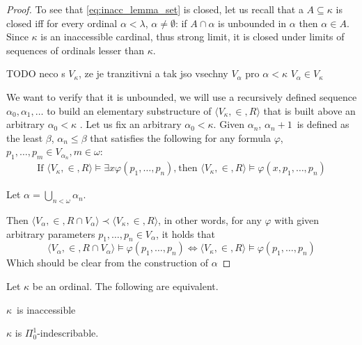 \begin{proof}
To see that \ref{eq:inacc_lemma_set} is closed, let us recall that a $A \subseteq \kappa$ is closed iff for every ordinal $\alpha < \lambda$, $\alpha \neq \emptyset$: if $A \cap \alpha$ is unbounded in $\alpha$ then $\alpha \in A$. Since $\kappa$ is an inaccessible cardinal, thus strong limit, it is closed under limits of sequences of ordinals lesser than $\kappa$.  

TODO neco s $V_\kappa$, ze je tranzitivni a tak jso vsechny $V_\alpha$ pro $\alpha<\kappa$ $V_\alpha \in V_\kappa$

We want to verify that it is unbounded, we will use a recursively defined sequence $\alpha_0, \alpha_1, \ldots$
to build an elementary substructure of $\langle V_\kappa, \in, R \rangle$ that is built above an arbitrary $\alpha_0 <\kappa$ .
Let us fix an arbitrary $\alpha_0 < \kappa$. Given $\alpha_n$, $\alpha_n+1$ is defined as the least $\beta$, $\alpha_n \leq \beta$ that satisfies 
the following for any formula $\varphi$, $p_1, \ldots, p_m \in V_{\alpha_{n}}, m \in \omega$:
\begin{equation}
\begin{gathered}
\mbox{If }\langle V_\kappa, \in, R \rangle \models \exists x \varphi(p_1, \ldots, p_n)\mbox{,}\
\mbox{then }\langle V_\kappa, \in, R \rangle \models \varphi(x, p_1, \ldots, p_n)
\end{gathered}
\end{equation}

Let $\alpha = \bigcup_{n < \omega} \alpha_n$. 

Then $\langle V_\alpha, \in, R \cap V_\alpha \rangle \prec \langle V_\kappa, \in, R \rangle$, in other words, for any $\varphi$ with given arbitrary parameters $p_1, \ldots, p_n \in V_\alpha$, it holds that
\begin{equation}
\langle V_\alpha, \in, R \cap V_\alpha \rangle \models \varphi(p_1, \ldots, p_n) \iff \langle V_\kappa, \in, R \rangle \models \varphi(p_1, \ldots, p_n)
\end{equation}
Which should be clear from the construction of $\alpha$
\end{proof}

\begin{theorem}
Let $\kappa$ be an ordinal. The following are equivalent.
\bce[(i)]
\item $\kappa$ is inaccessible
\item $\kappa$ is $\Pi^1_0$-indescribable.
\ece
\end{theorem}

